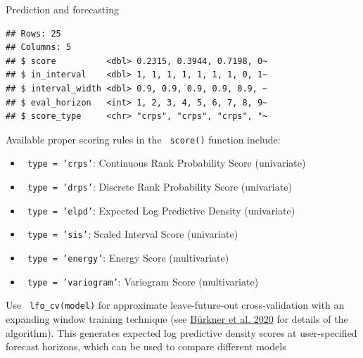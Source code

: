 \documentclass[final,9pt,fleqn]{beamer}\usepackage[]{graphicx}\usepackage[]{xcolor}
\makeatletter
\newenvironment{kframe}{%
 \def\at@end@of@kframe{}%
 \ifinner\ifhmode%
  \def\at@end@of@kframe{\end{minipage}}%
  \begin{minipage}{\columnwidth}%
 \fi\fi%
 \def\FrameCommand##1{\hskip\@totalleftmargin \hskip-\fboxsep
 \colorbox{shadecolor}{##1}\hskip-\fboxsep
     \hskip-\linewidth \hskip-\@totalleftmargin \hskip\columnwidth}%
 \MakeFramed {\advance\hsize-\width
   \@totalleftmargin\z@ \linewidth\hsize
   \@setminipage}}%
 {\par\unskip\endMakeFramed%
 \at@end@of@kframe}
\newenvironment{knitrout}{}{} %
\makeatother
\begin{document}
\begin{frame}[fragile]
\begin{columns}
\begin{column}{0.3\paperwidth}
\begin{block}{{\fontsize{21}{21} \selectfont \color{BrickRed} Prediction and forecasting}}
\begin{knitrout}
\color{fgcolor}\begin{kframe}
\begin{verbatim}
## Rows: 25
## Columns: 5
## $ score          <dbl> 0.2315, 0.3944, 0.7198, 0~
## $ in_interval    <dbl> 1, 1, 1, 1, 1, 1, 1, 0, 1~
## $ interval_width <dbl> 0.9, 0.9, 0.9, 0.9, 0.9, ~
## $ eval_horizon   <int> 1, 2, 3, 4, 5, 6, 7, 8, 9~
## $ score_type     <chr> "crps", "crps", "crps", "~
\end{verbatim}
\end{kframe}
\end{knitrout}
\smallskip
Available proper scoring rules in the \texttt{\color{Orchid} score()} function include:
\begin{itemize}

\item \texttt{\color{Orchid} type = 'crps'}: Continuous Rank Probability Score (univariate)
\item \texttt{\color{Orchid} type = 'drps'}: Discrete Rank Probability Score (univariate)
\item \texttt{\color{Orchid} type = 'elpd'}: Expected Log Predictive Density (univariate)
\item \texttt{\color{Orchid} type = 'sis'}: Scaled Interval Score (univariate)
\item \texttt{\color{Orchid} type = 'energy'}: Energy Score (multivariate)
\item \texttt{\color{Orchid} type = 'variogram'}: Variogram Score (multivariate)
\end{itemize}

\medskip
Use \texttt{\color{Orchid} lfo\_cv(model)} for approximate leave-future-out cross-validation with an expanding window training technique (see \href{https://www.tandfonline.com/doi/full/10.1080/00949655.2020.1783262}{Bürkner et al. 2020} for details of the algorithm). This generates expected log predictive density scores at user-specified forecast horizons, which can be used to compare different models

\end{block}
\end{column}

\end{columns}
\end{frame}
\end{document}
